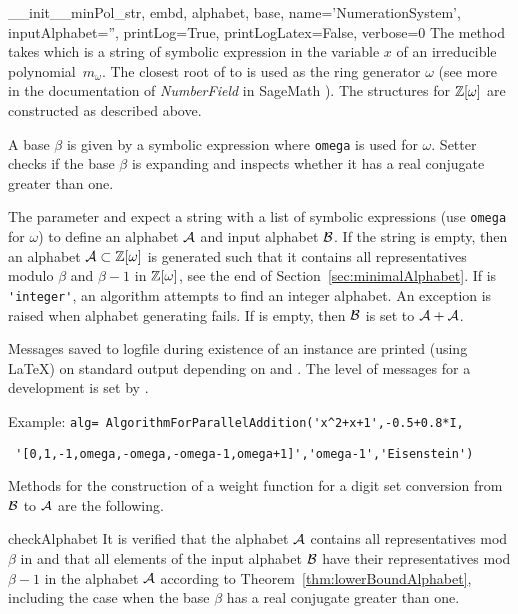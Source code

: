 \begin{method}{\_\_init\_\_}{minPol\_str, embd, alphabet, base, name='NumerationSystem', inputAlphabet='', printLog=True, printLogLatex=False, verbose=0}
The method takes  which is a string of symbolic expression in the variable $x$ of an irreducible polynomial~$m_\omega$. The closest root of   to  is used as the ring generator $\omega$ (see more in the documentation of \emph{NumberField} in SageMath \cite{sage}). The structures for $\mathbb{Z}[\omega]$ are constructed as described above. 

A base $\beta$ is given by a symbolic expression  where \verb+omega+ is used for $\omega$.
Setter  checks if the base $\beta$ is expanding and inspects whether it has a real conjugate greater than one.

The parameter  and  expect a string with a list of symbolic expressions (use \verb+omega+ for $\omega$) to define an alphabet $\mathcal{A}$ and input alphabet $\mathcal{B}$. If the string  is empty, then an alphabet $\mathcal{A}\subset\mathbb{Z}[\omega]$ is generated such that it contains all representatives modulo $\beta$ and $\beta-1$ in $\mathbb{Z}[\omega]$, see the end of Section~\ref{sec:minimalAlphabet}. %
If  is \verb+'integer'+, %
 an algorithm attempts to find an integer alphabet. An exception is raised when alphabet generating fails. If   is empty, then $\mathcal{B}$ is set to $\mathcal{A}+\mathcal{A}$.

Messages saved to logfile during existence of an instance are printed (using \LaTeX) on standard output depending on  and . The level of messages for a development is set by .

Example:
\verb|alg= AlgorithmForParallelAddition('x^2+x+1',-0.5+0.8*I,|

\verb| '[0,1,-1,omega,-omega,-omega-1,omega+1]','omega-1','Eisenstein')|
\end{method}

Methods for the construction of a weight function for a digit set conversion from $\mathcal{B}$ to $\mathcal{A}$ are the following.

\newpage
\begin{method}{checkAlphabet}{}
It is verified that the alphabet $\mathcal{A}$ contains all representatives mod $\beta$ in  and that all elements of the input alphabet $\mathcal{B}$ have their representatives mod $\beta-1$ in the alphabet $\mathcal{A}$ according to Theorem~\ref{thm:lowerBoundAlphabet}, including the case when the base $\beta$ has a real conjugate greater than one.
\end{method}

